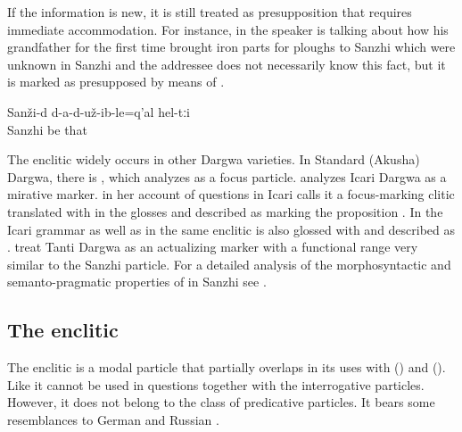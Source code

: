 If the information is new, it is still treated as presupposition that requires immediate accommodation. For instance, in  the speaker is talking about how his grandfather for the first time brought iron parts for ploughs to Sanzhi which were unknown in Sanzhi and the addressee does not necessarily know this fact, but it is marked as presupposed by means of .
%
\begin{exe}
	\ex	\label{ex:In Sanzhi, they did not have them (the iron item that you use on wooden ploughs) minor}
	\gll	Sanži-d	d-a-d-už-ib-le=q'al	hel-tːi\\
		Sanzhi	be	that\\
	\glt	{}
\end{exe}

The enclitic  widely occurs in other Dargwa varieties. In Standard (Akusha) Dargwa, there is , which \citet[748]{vandenBerg2001} analyzes as a focus particle. \citet{Tatevosov2001} analyzes Icari Dargwa  as a mirative marker. \citet{Sumbatova2009} in her account of questions in Icari calls it a focus-marking clitic translated with  in the glosses and described as marking the proposition . In the Icari grammar as well as in \citet{Kalinina.Sumbatova2007} the same enclitic is also glossed with  and described as . \citet[338]{Sumbatova.Lander2014} treat Tanti Dargwa  as an actualizing marker with a functional range very similar to the Sanzhi particle. For a detailed analysis of the morphosyntactic and semanto-pragmatic properties of  in Sanzhi see \citet{ForkerSubmittedc}.



\subsection{The enclitic }
\label{ssec:The enclitic =q'ar}

The enclitic  is a modal particle that partially overlaps in its uses with  () and  (). Like  it cannot be used in questions together with the interrogative particles. However, it does not belong to the class of predicative particles. It bears some resemblances to German  and Russian .

